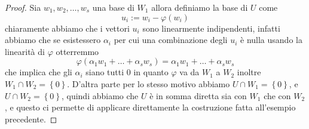 \documentclass[11pt]{scrartcl}
\begin{document}
   	 \begin{proof}
   	 	Sia $w_1,w_2,\dots,w_s$ una base di $W_1$ allora definiamo la base di $U$ come
   	 	$$u_i:=w_i-\varphi(w_i)$$
   	 	chiaramente abbiamo che i vettori $u_i$ sono linearmente indipendenti, infatti abbiamo che se esistessero $\alpha_i$ per cui una combinazione degli $u_i$ è nulla usando la linearità di $\varphi$ otterremmo
   	 	$$\varphi(\alpha_1w_1+\dots+\alpha_sw_s)=\alpha_1w_1+\dots+\alpha_sw_s$$
   	 	che implica che gli $\alpha_i$ siano tutti $0$ in quanto $\varphi$ va da $W_1$ a $W_2$ inoltre $W_1\cap W_2=\left\{0\right\}$. D'altra parte per lo stesso motivo abbiamo $U\cap W_1=\left\{0\right\}$, e $U\cap W_2=\left\{0\right\}$, quindi abbiamo che $U$ è in somma diretta sia con $W_1$ che con $W_2$, e questo ci permette di applicare direttamente la costruzione fatta all'esempio precedente.
   	 \end{proof}
\end{document}
